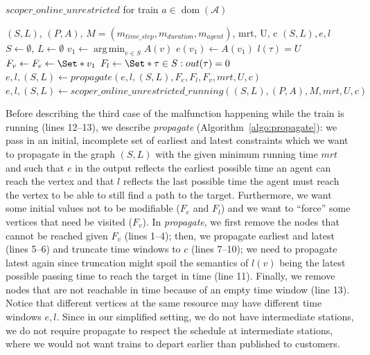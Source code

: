 \documentclass{article}
\DeclareMathOperator{\dom}{dom}
\DeclareMathOperator*{\argmin}{arg\,min}
\begin{document}
\begin{algorithm}
	\caption{$scoper\_online\_unrestricted$ for train $a \in \dom(\mathcal{A})$} \label{algo:Delta0}
	\begin{algorithmic}[1]
		\Require $(S,L)$, $(P,A)$, $M=(m_{time\_step},m_{duration},m_{agent})$, mrt, U, c
	    \Ensure $(S,L),e,l$
            \State $S\leftarrow \emptyset$, $L \leftarrow \emptyset$
            \State $v_1 \leftarrow \argmin_{v\in S} A(v)$
            \State $e(v_1) \leftarrow A(v_1)$
                \State $l(\tau)=U$
            \EndFor
            \State $F_v \leftarrow F_e \leftarrow \Set*{v_1}$
            \State $F_l \leftarrow \Set*{\tau \in S: out(\tau)=0}$
            \State $e,l,(S,L) \leftarrow propagate(e,l,(S,L),F_e,F_l,F_v, mrt, U, c)$
        \Else
            \State $e,l,(S,L) \leftarrow scoper\_online\_unrestricted\_running((S,L), (P,A), M, mrt, U, c)$
        \EndIf
\end{algorithmic}
\end{algorithm}


Before describing the third case of the malfunction happening while the train is running (lines 12--13), we describe \emph{propagate} (Algorithm~\ref{algo:propagate}): we pass in an initial, incomplete set of earliest and latest constraints which we want to propagate in the graph $(S,L)$ with the given minimum running time $mrt$ and such that $e$ in the output reflects the earliest possible time an agent can reach the vertex and that  $l$ reflects the last possible time the agent must reach the vertex to be able to still find a path to the target. Furthermore, we want some initial values not to be modifiable ($F_e$ and $F_l$) and we want to ``force'' some vertices that need be visited ($F_v$). In \emph{propagate}, we first remove the nodes that cannot be reached given $F_v$ (lines 1--4); then, we propagate earliest and latest (lines 5--6) and truncate time windows to $c$ (lines 7--10); we need to propagate latest again since truncation might spoil the semantics of $l(v)$ being the latest possible passing time to reach the target in time (line 11). Finally, we remove nodes that are not reachable in time because of an empty time window (line 13). Notice that different vertices at the same resource may have different time windows $e,l$. Since in our simplified setting, we do not have intermediate stations, we do not require propagate to respect the schedule at intermediate stations, where we would not want trains to depart earlier than published to customers.
\end{document}
